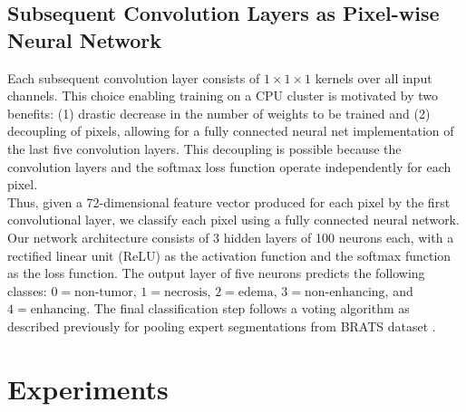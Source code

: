 \documentclass{llncs}
\begin{document}
\subsection{Subsequent Convolution Layers as Pixel-wise Neural Network}
Each subsequent convolution layer consists of  $1 \times 1 \times 1$ kernels over all input channels. This choice enabling training on a CPU cluster is motivated by two benefits: (1) drastic decrease in the number of weights to be trained and (2) decoupling of pixels, allowing for a fully connected neural net implementation of the last five convolution layers. This decoupling is possible because the convolution layers and the softmax loss function operate independently for each pixel. \\
\indent Thus, given a 72-dimensional feature vector produced for each pixel by the first convolutional layer, we classify each pixel using a fully connected neural network. Our network architecture consists of 3 hidden layers of 100 neurons each, with a rectified linear unit (ReLU) as the activation function and the softmax function as the loss function.  The output layer of five neurons predicts the following classes: $0 = \text{non-tumor}$, $1 = \text{necrosis}$, $2 = \text{edema}$, $3 = \text{non-enhancing}$, and $4 = \text{enhancing}$.  The final classification step follows a voting algorithm as described previously for pooling expert segmentations from BRATS dataset \cite{brats}. 

 



\section{Experiments}
\end{document}
